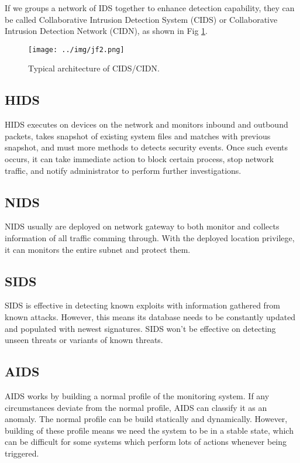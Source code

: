 \documentclass[12pt]{report}
\begin{document}
If we groups a network of IDS together to enhance detection capability, they can be called Collaborative Intrusion Detection System (CIDS) or Collaborative Intrusion Detection Network (CIDN), as shown in Fig \ref{fig:jf2}.

\begin{figure}[H]
	\centering
	\texttt{[image: ../img/jf2.png]}
	\caption{Typical architecture of CIDS/CIDN. \cite{8274922}}
	\label{fig:jf2}
\end{figure}

\subsection{HIDS}
HIDS executes on devices on the network and monitors inbound and outbound packets, takes snapshot of existing system files and matches with previous snapshot, and must more methods to detects security events. Once such events occurs, it can take immediate action to block certain process, stop network traffic, and notify administrator to perform further investigations.

\subsection{NIDS}
NIDS usually are deployed on network gateway to both monitor and collects information of all traffic comming through. With the deployed location privilege, it can monitors the entire subnet and protect them.

\subsection{SIDS}
SIDS is effective in detecting known exploits with information gathered from known attacks. However, this means its database needs to be constantly updated and populated with newest signatures. SIDS won't be effective on detecting unseen threats or variants of known threats.

\subsection{AIDS}
AIDS works by building a normal profile of the monitoring system. If any circumstances deviate from the normal profile, AIDS can classify it as an anomaly. The normal profile can be build statically and dynamically. However, building of these profile means we need the system to be in a stable state, which can be difficult for some systems which perform lots of actions whenever being triggered.
\end{document}
